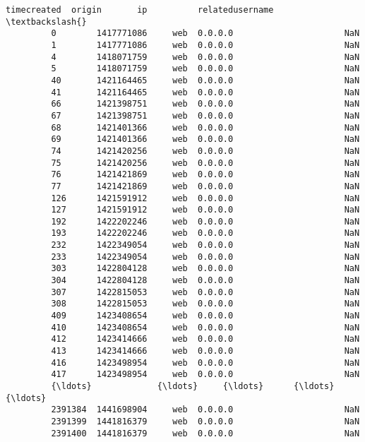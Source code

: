 \documentclass[11pt]{article}
\begin{document}
\begin{Verbatim}[commandchars=\\\{\}]
                 timecreated  origin       ip          relatedusername  \textbackslash{}
         0        1417771086     web  0.0.0.0                      NaN   
         1        1417771086     web  0.0.0.0                      NaN   
         4        1418071759     web  0.0.0.0                      NaN   
         5        1418071759     web  0.0.0.0                      NaN   
         40       1421164465     web  0.0.0.0                      NaN   
         41       1421164465     web  0.0.0.0                      NaN   
         66       1421398751     web  0.0.0.0                      NaN   
         67       1421398751     web  0.0.0.0                      NaN   
         68       1421401366     web  0.0.0.0                      NaN   
         69       1421401366     web  0.0.0.0                      NaN   
         74       1421420256     web  0.0.0.0                      NaN   
         75       1421420256     web  0.0.0.0                      NaN   
         76       1421421869     web  0.0.0.0                      NaN   
         77       1421421869     web  0.0.0.0                      NaN   
         126      1421591912     web  0.0.0.0                      NaN   
         127      1421591912     web  0.0.0.0                      NaN   
         192      1422202246     web  0.0.0.0                      NaN   
         193      1422202246     web  0.0.0.0                      NaN   
         232      1422349054     web  0.0.0.0                      NaN   
         233      1422349054     web  0.0.0.0                      NaN   
         303      1422804128     web  0.0.0.0                      NaN   
         304      1422804128     web  0.0.0.0                      NaN   
         307      1422815053     web  0.0.0.0                      NaN   
         308      1422815053     web  0.0.0.0                      NaN   
         409      1423408654     web  0.0.0.0                      NaN   
         410      1423408654     web  0.0.0.0                      NaN   
         412      1423414666     web  0.0.0.0                      NaN   
         413      1423414666     web  0.0.0.0                      NaN   
         416      1423498954     web  0.0.0.0                      NaN   
         417      1423498954     web  0.0.0.0                      NaN   
         {\ldots}             {\ldots}     {\ldots}      {\ldots}                      {\ldots}   
         2391384  1441698904     web  0.0.0.0                      NaN   
         2391399  1441816379     web  0.0.0.0                      NaN   
         2391400  1441816379     web  0.0.0.0                      NaN   

\end{Verbatim}
\end{document}
